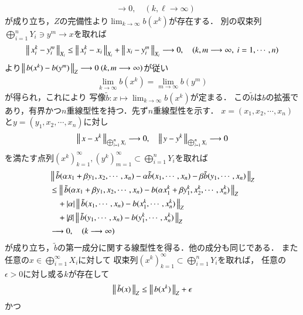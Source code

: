 \begin{prf}
\begin{align}
			&\longrightarrow 0,
			\quad (k,\ell \longrightarrow \infty)
		\end{align}
		が成り立ち，$Z$の完備性より$\lim_{k \to \infty}b(x^k)$が存在する．
		別の収束列
		$\bigoplus_{i=1}^n Y_i \ni y^m \longrightarrow x$を取れば
		\begin{align}
			\left\|\, x^k_i - y^m_i\, \right\|_{X_i} \leq \left\|\, x^k_i - x_i\, \right\|_{X_i} + \left\|\, x_i - y^m_i\, \right\|_{X_i}
			\longrightarrow 0,
			\quad (k,m \longrightarrow \infty,\ i=1,\cdots,n)
		\end{align}
		より$\left\|\, b(x^k) - b(y^m)\, \right\|_{Z} \longrightarrow 0\ (k,m \longrightarrow \infty)$が従い
		\begin{align}
			\lim_{k \to \infty} b(x^k) = \lim_{m \to \infty} b(y^m)
		\end{align}
		が得られ，これにより
		写像$\tilde{b}:x \longmapsto \lim_{k \to \infty} b(x^k)$が定まる．
		この$\tilde{b}$は$b$の拡張であり，有界かつ$n$重線型性を持つ．先ず$n$重線型性を示す．
		$x = (x_1,x_2,\cdots,x_n)$と$y = (y_1,x_2,\cdots,x_n)$に対し
		\begin{align}
			\left\|\, x - x^k\, \right\|_{\bigoplus_{i=1}^n X_i} 
			\longrightarrow 0,
			\quad \left\|\, y - y^k\, \right\|_{\bigoplus_{i=1}^n X_i} 
			\longrightarrow 0
		\end{align}
		を満たす点列$(x^k)_{k=1}^\infty,(y^k)_{m=1}^\infty \subset \bigoplus_{i=1}^n Y_i$を取れば
		\begin{align}
			&\left\|\, \tilde{b}(\alpha x_1 + \beta y_1,x_2,\cdots,x_n) 
				- \alpha \tilde{b}(x_1,\cdots,x_n)
				- \beta \tilde{b}(y_1,\cdots,x_n)\, \right\|_{Z} \\
			&\leq \left\|\, \tilde{b}(\alpha x_1 + \beta y_1,x_2,\cdots,x_n)
				- b(\alpha x^k_1 + \beta y^k_1,x^k_2,\cdots,x^k_n)\, \right\|_{Z} \\
				&\quad + |\alpha| \left\|\, \tilde{b}(x_1,\cdots,x_n)
				- b(x^k_1,\cdots,x^k_n)\, \right\|_{Z} \\
				&\quad + |\beta| \left\|\, \tilde{b}(y_1,\cdots,x_n)
				- b(y^k_1,\cdots,x^k_n)\, \right\|_{Z} \\
			&\longrightarrow 0,
			\quad (k \longrightarrow \infty)
		\end{align}
		が成り立ち，$\tilde{b}$の第一成分に関する線型性を得る．他の成分も同じである．
		また任意の$x \in \bigoplus_{i=1}^\infty X_i$に対して
		収束列$(x^k)_{k=1}^\infty \subset \bigoplus_{i=1}^n Y_i$を取れば，
		任意の$\epsilon > 0$に対し或る$k$が存在して
		\begin{align}
			\left\|\, \tilde{b}(x)\, \right\|_{Z} \leq \left\|\, b(x^k)\, \right\|_{Z} + \epsilon
		\end{align}
		かつ
		\begin{align}

\end{align}
\end{prf}
